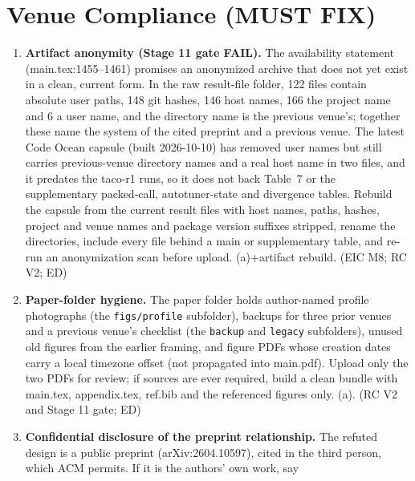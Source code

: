 \documentclass[11pt]{article}
\begin{document}
\section*{Venue Compliance (MUST FIX)}

\begin{enumerate}[label=V\arabic*.]
  \item \textbf{Artifact anonymity (Stage 11 gate FAIL).} The availability
        statement (main.tex:1455--1461) promises an anonymized archive that
        does not yet exist in a clean, current form. In the raw result-file
        folder, 122 files contain absolute user paths, 148 git hashes, 146
        host names, 166 the project name and 6 a user name, and the directory
        name is the previous venue's; together these name the system of the
        cited preprint and a previous venue. The latest Code Ocean capsule
        (built 2026-10-10) has removed user names but still carries
        previous-venue directory names and a real host name in two files, and
        it predates the taco-r1 runs, so it does not back Table~7 or the
        supplementary packed-call, autotuner-state and divergence tables.
        Rebuild the capsule from the current result files with host names,
        paths, hashes, project and venue names and package version suffixes
        stripped, rename the directories, include every file behind a main or
        supplementary table, and re-run an anonymization scan before upload.
        (a)+artifact rebuild. (EIC M8; RC V2; ED)
  \item \textbf{Paper-folder hygiene.} The paper folder holds author-named
        profile photographs (the \texttt{figs/profile} subfolder), backups for
        three prior venues and a previous venue's checklist (the
        \texttt{backup} and \texttt{legacy} subfolders), unused old figures
        from the earlier framing, and figure PDFs whose creation dates carry a
        local timezone offset (not propagated into main.pdf). Upload only the
        two PDFs for review; if sources are ever required, build a clean
        bundle with main.tex, appendix.tex, ref.bib and the referenced figures
        only. (a). (RC V2 and Stage 11 gate; ED)
  \item \textbf{Confidential disclosure of the preprint relationship.} The
        refuted design is a public preprint (arXiv:2604.10597), cited in the
        third person, which ACM permits. If it is the authors' own work, say

\end{enumerate}
\end{document}
